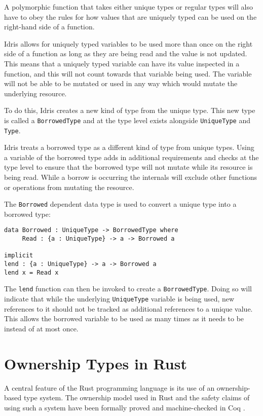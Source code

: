 \documentclass[onehalf,11pt]{beavtex}
\begin{document}
A polymorphic function that takes either unique types or regular types will also
have to obey the rules for how values that are uniquely typed can be used
on the right-hand side of a function.

Idris allows for uniquely typed variables to be used more than once on the right
side of a function as long as they are being read and the value is not
updated.
This means that a uniquely typed variable can have its value inspected in a
function, and this will not count towards that variable being used.
The variable will not be able to be mutated or used in any way which would
mutate the underlying resource.

To do this, Idris creates a new kind of type from the unique type.
This new type is called a \texttt{BorrowedType} and at
the type level exists alongside \texttt{UniqueType} and \texttt{Type}.

Idris treats a borrowed type as a different kind of type from unique types.
Using a variable of the borrowed type adds in additional
requirements and checks at the type level to ensure that the borrowed type
will not mutate while its resource is being read.
While a borrow is occurring the internals will exclude other functions or
operations from mutating the resource.

The \texttt{Borrowed} dependent data type is used to convert a unique type into
a borrowed type:

\begin{verbatim}
data Borrowed : UniqueType -> BorrowedType where
     Read : {a : UniqueType} -> a -> Borrowed a

implicit
lend : {a : UniqueType} -> a -> Borrowed a
lend x = Read x
\end{verbatim}

The \texttt{lend} function can then be invoked to create a \texttt{BorrowedType}.
Doing so will indicate that while the underlying \texttt{UniqueType} variable is
being used, new references to it should not be tracked as additional references
to a unique value.  This allows the borrowed variable to be used as many times
as it needs to be instead of at most once. 

\section{Ownership Types in Rust}

A central feature of the Rust programming language is its use of an
ownership-based type system. The ownership model used in Rust and the
safety claims of using such a system have been formally proved and
machine-checked in Coq \cite{Jung:2017:RSF:3177123.3158154}.
\end{document}
